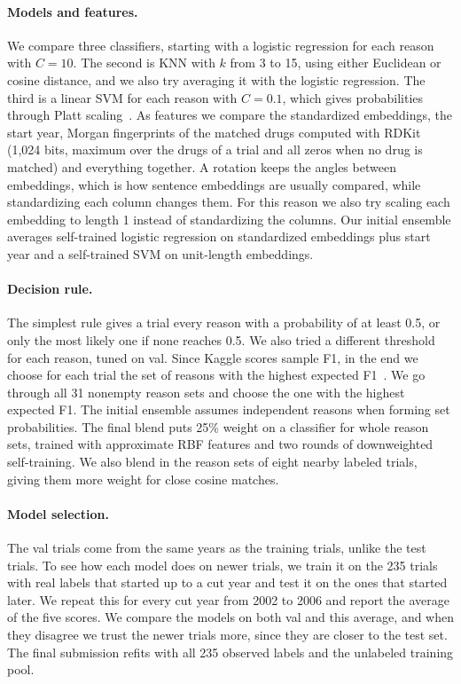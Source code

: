 \documentclass[10pt,twocolumn,letterpaper]{article}
\begin{document}
\paragraph{Models and features.}
We compare three classifiers, starting with a logistic regression for each reason with $C=10$. The second is KNN with $k$ from 3 to 15, using either Euclidean or cosine distance, and we also try averaging it with the logistic regression. The third is a linear SVM for each reason with $C=0.1$, which gives probabilities through Platt scaling~\cite{platt1999probabilistic}.
As features we compare the standardized embeddings, the start year, Morgan fingerprints of the matched drugs computed with RDKit~\cite{rdkit} (1{,}024 bits, maximum over the drugs of a trial and all zeros when no drug is matched) and everything together.
A rotation keeps the angles between embeddings, which is how sentence embeddings are usually compared, while standardizing each column changes them.
For this reason we also try scaling each embedding to length 1 instead of standardizing the columns.
Our initial ensemble averages self-trained logistic regression on standardized embeddings plus start year and a self-trained SVM on unit-length embeddings.

\paragraph{Decision rule.}
The simplest rule gives a trial every reason with a probability of at least 0.5, or only the most likely one if none reaches 0.5.
We also tried a different threshold for each reason, tuned on val.
Since Kaggle scores sample F1, in the end we choose for each trial the set of reasons with the highest expected F1~\cite{ye2012optimizing,dembczynski2011exact}.
We go through all 31 nonempty reason sets and choose the one with the highest expected F1. The initial ensemble assumes independent reasons when forming set probabilities. The final blend puts 25\% weight on a classifier for whole reason sets, trained with approximate RBF features and two rounds of downweighted self-training. We also blend in the reason sets of eight nearby labeled trials, giving them more weight for close cosine matches.

\paragraph{Model selection.}
The val trials come from the same years as the training trials, unlike the test trials.
To see how each model does on newer trials, we train it on the 235 trials with real labels that started up to a cut year and test it on the ones that started later.
We repeat this for every cut year from 2002 to 2006 and report the average of the five scores.
We compare the models on both val and this average, and when they disagree we trust the newer trials more, since they are closer to the test set.
The final submission refits with all 235 observed labels and the unlabeled training pool.
\end{document}
